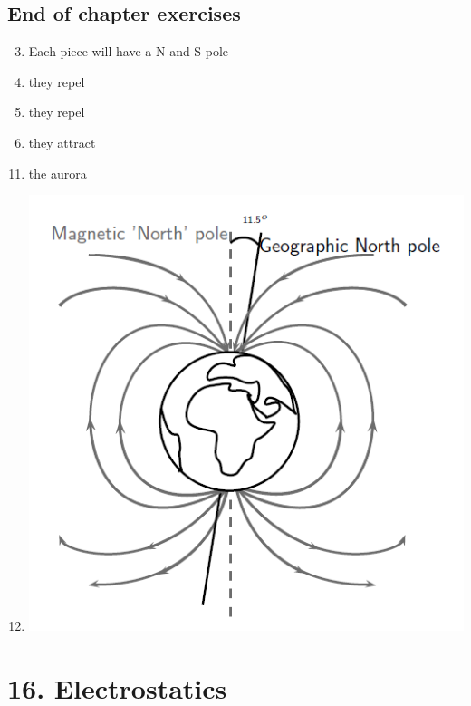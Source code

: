 \subsection{End of chapter exercises}
\begin{multicols}{2}
 \begin{enumerate}[noitemsep, label=\textbf{(\arabic*)} ]
\setcounter{enumi}{2}
\item Each piece will have a N and S pole
\item they repel
\item they repel
\item they attract
\end{enumerate}
 \begin{enumerate}[noitemsep, label=\textbf{(\arabic*)} ]
\setcounter{enumi}{10}
\item the aurora
\item \includegraphics[width=.2\textwidth]{photos/magnetism_earthsfield.png}
 \end{enumerate}
\end{multicols}

\section{16. Electrostatics}
